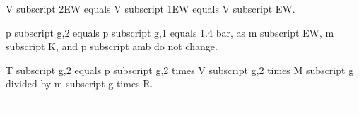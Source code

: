 V subscript 2EW equals V subscript 1EW equals V subscript EW.  

p subscript g,2 equals p subscript g,1 equals 1.4 bar, as m subscript EW, m subscript K, and p subscript amb do not change.  

T subscript g,2 equals p subscript g,2 times V subscript g,2 times M subscript g divided by m subscript g times R.  

---